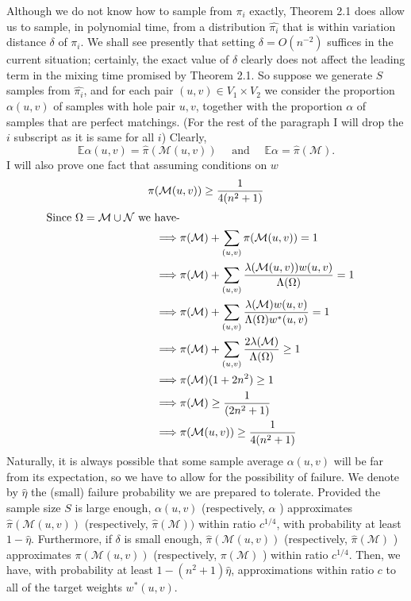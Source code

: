 \begin{itemize}
\begin{flushleft}
	Although we do not know how to sample from $\pi_i$ exactly, Theorem 2.1 does allow us to sample, in polynomial time, from a distribution $\hat{\pi_i}$ that is within variation distance $\delta$ of $\pi_i$. We shall see presently that setting $\delta=O\left(n^{-2}\right)$ suffices in the current situation; certainly, the exact value of $\delta$ clearly does not affect the leading term in the mixing time promised by Theorem 2.1. So suppose we generate $S$ samples from $\hat{\pi_i}$, and for each pair $(u, v) \in V_1 \times V_2$ we consider the proportion $\alpha(u, v)$ of samples with hole pair $u, v$, together with the proportion $\alpha$ of samples that are perfect matchings.
	(For the rest of the paragraph I will drop the $i$ subscript as it is same for all $i$) Clearly,
	$$
	\mathbb{E} \alpha(u, v)=\hat{\pi}(\mathcal{M}(u, v)) \quad \text { and } \quad \mathbb{E} \alpha=\hat{\pi}(\mathcal{M}) .
	$$
	I will also prove one fact that assuming conditions on $w$  $$\pi(\mathcal{M}(u,v))\geq \frac{1}{4(n^2+1)}$$
	\begin{align*}
		\text{Since } \Omega=\mathcal{M} \cup \mathcal{N} \text{ we have-}\\
		\implies & \pi(\mathcal{M}) + \sum_{(u,v)}\pi(\mathcal{M}(u,v))=1\\
		\implies & \pi(\mathcal{M})+\sum_{(u,v)} \frac{\lambda(\mathcal{M}(u,v))w(u,v)}{\Lambda(\Omega)} =1\\
		\implies & \pi(\mathcal{M})+\sum_{(u,v)} \frac{\lambda(\mathcal{M})w(u,v)}{\Lambda(\Omega)w^*(u,v)}=1\\
		\implies & \pi(\mathcal{M})+\sum_{(u,v)} \frac{2\lambda(\mathcal{M})}{\Lambda(\Omega)} \geq1\\
		\implies & \pi(\mathcal{M})(1+2n^2) \geq 1\\
		\implies & \pi(\mathcal{M}) \geq \frac{1}{(2n^2+1)}\\
		\implies & \pi(\mathcal{M}(u,v))\geq \frac{1}{4(n^2+1)}
	\end{align*}
	Naturally, it is always possible that some sample average $\alpha(u, v)$ will be far from its expectation, so we have to allow for the possibility of failure. We denote by $\hat{\eta}$ the (small) failure probability we are prepared to tolerate. Provided the sample size $S$ is large enough, $\alpha(u, v)$ (respectively, $\alpha$ ) approximates $\hat{\pi}(\mathcal{M}(u, v))$ (respectively, $\hat{\pi}(\mathcal{M}))$ within ratio $c^{1 / 4}$, with probability at least $1-\hat{\eta}$. Furthermore, if $\delta$ is small enough, $\hat{\pi}(\mathcal{M}(u, v))$ (respectively, $\hat{\pi}(\mathcal{M})$ ) approximates $\pi(\mathcal{M}(u, v))$ (respectively, $\pi(\mathcal{M})$ ) within ratio $c^{1 / 4}$. Then,  we have, with probability at least $1-\left(n^2+1\right) \hat{\eta}$, approximations within ratio $c$ to all of the target weights $w^*(u, v)$.
	

\end{flushleft}
\end{itemize}
